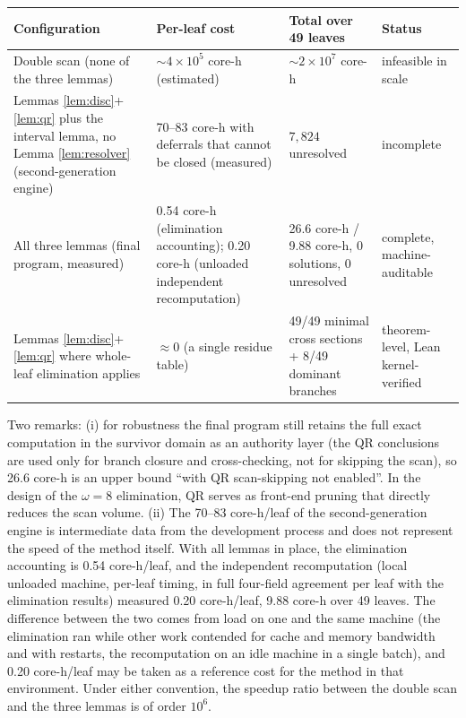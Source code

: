 \documentclass[11pt]{article}
\theoremstyle{remark}
\begin{document}
\begin{center}\footnotesize
\begin{tabular}{p{4.6cm}p{3.4cm}p{3.2cm}p{2.6cm}}
\toprule Configuration & Per-leaf cost & Total over 49 leaves & Status \\
\midrule Double scan (none of the three lemmas) & $\sim 4 \times 10^5$ core-h (estimated) & $\sim 2 \times 10^7$ core-h & infeasible in scale \\
Lemmas \ref{lem:disc}+\ref{lem:qr} plus the interval lemma, no Lemma \ref{lem:resolver} (second-generation engine) & 70--83 core-h with deferrals that cannot be closed (measured) & $7{,}824$ unresolved & incomplete \\
All three lemmas (final program, measured) & 0.54 core-h (elimination accounting); 0.20 core-h (unloaded independent recomputation) & 26.6 core-h / 9.88 core-h, 0 solutions, 0 unresolved & complete, machine-auditable \\
Lemmas \ref{lem:disc}+\ref{lem:qr} where whole-leaf elimination applies & $\approx 0$ (a single residue table) & 49/49 minimal cross sections + 8/49 dominant branches & theorem-level, Lean kernel-verified \\
\bottomrule
\end{tabular}
\end{center}

Two remarks: (i) for robustness the final program still retains the full exact computation in the survivor domain as an authority layer (the QR conclusions are used only for branch closure and cross-checking, not for skipping the scan), so 26.6 core-h is an upper bound ``with QR scan-skipping not enabled''. In the design of the $\omega = 8$ elimination, QR serves as front-end pruning that directly reduces the scan volume. (ii) The 70--83 core-h/leaf of the second-generation engine is intermediate data from the development process and does not represent the speed of the method itself. With all lemmas in place, the elimination accounting is 0.54 core-h/leaf, and the independent recomputation (local unloaded machine, per-leaf timing, in full four-field agreement per leaf with the elimination results) measured 0.20 core-h/leaf, 9.88 core-h over 49 leaves. The difference between the two comes from load on one and the same machine (the elimination ran while other work contended for cache and memory bandwidth and with restarts, the recomputation on an idle machine in a single batch), and 0.20 core-h/leaf may be taken as a reference cost for the method in that environment. Under either convention, the speedup ratio between the double scan and the three lemmas is of order $10^6$.
\end{document}
